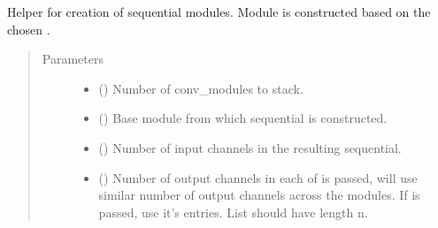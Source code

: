 \documentclass[letterpaper,10pt,english]{sphinxmanual}
\begin{document}
\begin{fulllineitems}
\label{\detokenize{api/training:geology.metamodelling.factories.sequential_factory}}
Helper for creation of sequential modules. Module is constructed based on the chosen .
\begin{quote}\begin{description}
\item[{Parameters}] \leavevmode\begin{itemize}
\item {} 
 () \textendash{} Number of conv\_modules to stack.

\item {} 
 () \textendash{} Base module from which sequential is constructed.

\item {} 
 () \textendash{} Number of input channels in the resulting sequential.

\item {} 
 (\sphinxstyleliteralemphasis{\sphinxupquote{, }}) \textendash{} Number of output channels in each of  is passed, will use similar number of output channels across the modules.
If  is passed, use it’s entries. List should have length n.


\end{itemize}
\end{description}
\end{quote}
\end{fulllineitems}
\end{document}
